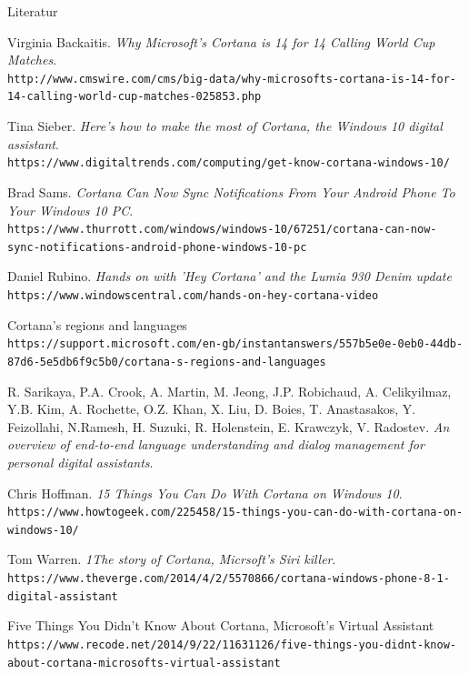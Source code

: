 \documentclass[18pt]{beamer}
\begin{document}
\begin{frame}[allowframebreaks]{Literatur}
\begin{thebibliography}{9}
		Virginia Backaitis.
		\textit{Why Microsoft's Cortana is 14 for 14 Calling World Cup Matches}.
		\\\texttt{http://www.cmswire.com/cms/big-data/why-microsofts-cortana-is-14-for-14-calling-world-cup-matches-025853.php}
		
		Tina Sieber.
		\textit{Here’s how to make the most of Cortana, the Windows 10 digital assistant}.
		\\\texttt{https://www.digitaltrends.com/computing/get-know-cortana-windows-10/}
		
		Brad Sams.
		\textit{Cortana Can Now Sync Notifications From Your Android Phone To Your Windows 10 PC}.
		\\\texttt{https://www.thurrott.com/windows/windows-10/67251/cortana-can-now-sync-notifications-android-phone-windows-10-pc}
		
		Daniel Rubino.
		\textit{Hands on with 'Hey Cortana' and the Lumia 930 Denim update}
		\\\texttt{https://www.windowscentral.com/hands-on-hey-cortana-video}
		
		Cortana's regions and languages
		\\\texttt{https://support.microsoft.com/en-gb/instantanswers/557b5e0e-0eb0-44db-87d6-5e5db6f9c5b0/cortana-s-regions-and-languages}
		
		R. Sarikaya, P.A. Crook, A. Martin, M. Jeong, J.P. Robichaud, A. Celikyilmaz, Y.B. Kim, A. Rochette, O.Z. Khan, X. Liu, D. Boies, T. Anastasakos, Y. Feizollahi, N.Ramesh, H. Suzuki, R. Holenstein, E. Krawczyk, V. Radostev. 
		\textit{An overview of end-to-end language understanding and dialog management for personal digital assistants}.
		
		Chris Hoffman.
		\textit{15 Things You Can Do With Cortana on Windows 10}.
		\\\texttt{https://www.howtogeek.com/225458/15-things-you-can-do-with-cortana-on-windows-10/}
		
		Tom Warren.
		\textit{1The story of Cortana, Micrsoft's Siri killer}.
		\\\texttt{https://www.theverge.com/2014/4/2/5570866/cortana-windows-phone-8-1-digital-assistant}
		
		Five Things You Didn't Know About Cortana, Microsoft’s Virtual Assistant
		\\\texttt{https://www.recode.net/2014/9/22/11631126/five-things-you-didnt-know-about-cortana-microsofts-virtual-assistant}
		

\end{thebibliography}
\end{frame}
\end{document}
